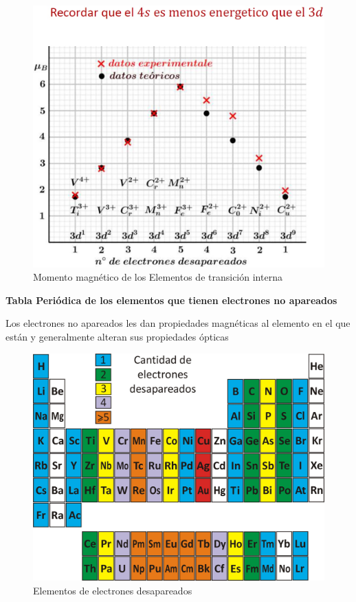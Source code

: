 \begin{figure}[H]
    \centering
    \includegraphics[width=1.0\textwidth]{./Figures/momMagElemTransicion2a}
	\caption{Momento magnético de los Elementos de transición interna}
	\label{fig:momMagElemTransicion2}
\end{figure}

\textbf{Tabla Periódica de los elementos que tienen electrones no apareados}

Los electrones no apareados les dan propiedades magnéticas al elemento en el que están y generalmente alteran sus propiedades ópticas

\begin{figure}[H]
    \centering
    \includegraphics[width=1.0\textwidth]{./Figures/TablaPeriodica2}
	\caption{Elementos de electrones desapareados}
	\label{fig:TablaPeriodica2}
\end{figure}




